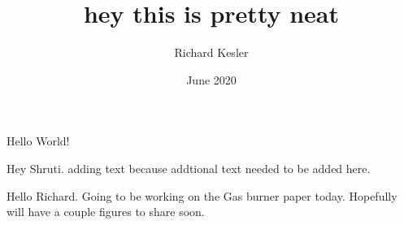 \documentclass{article}
\title{hey this is pretty neat}
\author{Richard Kesler}
\date{June 2020}
\begin{document}
	\maketitle
	Hello World!

	Hey Shruti. adding text because addtional text needed to be added here.

	Hello Richard. Going to be working on the Gas burner paper today. Hopefully will have a couple figures to share soon.
	
\end{document}

